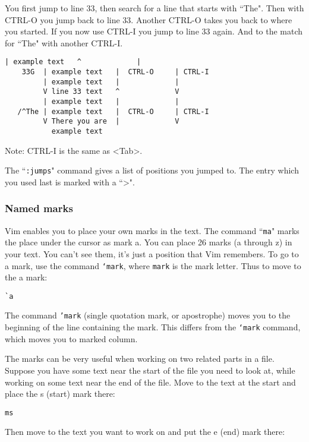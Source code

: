 You first jump to line 33, then search for a line that starts with ``The".
Then with CTRL-O you jump back to line 33.
Another CTRL-O takes you back to where you started.
If you now use CTRL-I you jump to line 33 again.
And to the match for ``The" with another CTRL-I.

\begin{Verbatim}[samepage=true]
         | example text   ^             |
    33G  | example text   |  CTRL-O     | CTRL-I
         | example text   |             |
         V line 33 text   ^             V
         | example text   |             |
   /^The | example text   |  CTRL-O     | CTRL-I
         V There you are  |             V
           example text
\end{Verbatim}

Note:
CTRL-I is the same as <Tab>.

The ``\texttt{:jumps}" command gives a list of positions you jumped to.
The entry which you used last is marked with a ``>".

\subsubsection{Named marks}
\label{bookmark}

Vim enables you to place your own marks in the text.
The command ``\texttt{ma}" marks the place under the cursor as mark a.
You can place 26 marks (a through z) in your text.
You can't see them, it's just a position that Vim remembers.
To go to a mark, use the command \texttt{`{mark}}, where \texttt{{mark}} is the mark letter.
Thus to move to the a mark:

 \begin{Verbatim}[samepage=true]
 `a
 \end{Verbatim}

The command \texttt{'mark} (single quotation mark, or apostrophe) moves you to the beginning of the line containing the mark.
This differs from the \texttt{`mark} command, which moves you to marked column.

The marks can be very useful when working on two related parts in a file.
Suppose you have some text near the start of the file you need to look at, while working on some text near the end of the file.
Move to the text at the start and place the s (start) mark there:

 \begin{Verbatim}[samepage=true]
 ms
 \end{Verbatim}

Then move to the text you want to work on and put the e (end) mark there:

